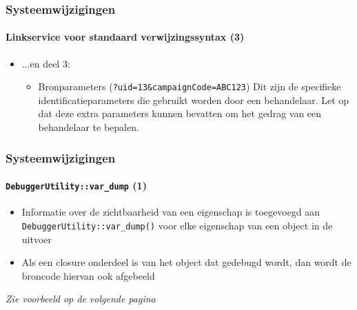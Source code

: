 \begin{frame}[fragile]
	\frametitle{Systeemwijzigingen}
	\framesubtitle{Linkservice voor standaard verwijzingssyntax (3)}

	\begin{itemize}

		\item ...en deel 3:

			\begin{itemize}

				\item Bronparameters (\texttt{?uid=13\&campaignCode=ABC123})\newline
					Dit zijn de specifieke identificatieparameters die gebruikt worden door een behandelaar.
					Let op dat deze extra parameters kunnen bevatten om het gedrag van een behandelaar te bepalen.

			\end{itemize}

	\end{itemize}

\end{frame}

\begin{frame}[fragile]
	\frametitle{Systeemwijzigingen}
	\framesubtitle{\texttt{DebuggerUtility::var\_dump} (1)}

	\begin{itemize}

		\item Informatie over de zichtbaarheid van een eigenschap is toegevoegd aan \texttt{DebuggerUtility::var\_dump()}
			\newline
			voor elke eigenschap van een object in de uitvoer

		\item Als een closure onderdeel is van het object dat gedebugd wordt, dan wordt de broncode hiervan ook afgebeeld

	\end{itemize}

	\tabto{0.75cm}\textit{Zie voorbeeld op de volgende pagina}

\end{frame}

